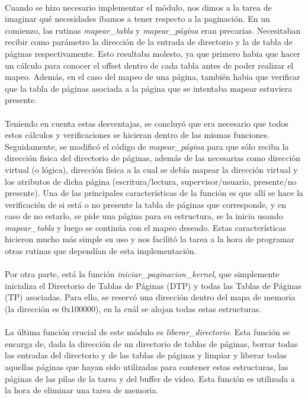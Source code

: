 \documentclass[11pt, a4paper]{article}
\begin{document}
\paragraph{}
Cuando se hizo necesario implementar el módulo, nos dimos a la tarea de imaginar qué necesidades íbamos a tener respecto a la paginación. En un comienzo, las rutinas \textit{mapear\_tabla} y \textit{mapear\_página} eran precarias. Necesitaban recibir como parámetro la dirección de la entrada de directorio y la de tabla de páginas respectivamente. Esto resultaba molesto, ya que primero habia que hacer un cálculo para conocer el offset dentro de cada tabla antes de poder realizar el mapeo. Además, en el caso del mapeo de una página, también habia que verificar que la tabla de páginas asociada a la página que se intentaba mapear estuviera presente.

\paragraph{}
Teniendo en cuenta estas desventajas, se concluyó que era necesario que todos estos cálculos y verificaciones se hicieran dentro de las mismas funciones. Seguidamente, se modificó el código de \textit{mapear\_página} para que sólo reciba la dirección fisica del directorio de páginas, además de las necesarias como dirección virtual (o lógica), dirección física a la cual se debía mapear la dirección virtual y los atributos de dicha página (escritura/lectura, supervisor/usuario, presente/no presente). Una de las principales características de la función es que allí se hace la verificación de si está o no presente la tabla de páginas que corresponde, y en caso de no estarlo, se pide una página para su estructura, se la inicia usando \textit{mapear\_tabla} y luego se continúa con el mapeo deseado. Estas características hicieron mucho más simple su uso y nos facilitó la tarea a la hora de programar otras rutinas que dependían de esta implementación.

\paragraph{}
Por otra parte, está la función \textit{iniciar\_paginacion\_kernel}, que simplemente inicializa el Directorio de Tablas de Páginas (DTP) y todas las Tablas de Páginas (TP) asociadas. Para ello, se reservó una dirección dentro del mapa de memoria (la dirección es 0x100000), en la cuál se alojan todas estas estructuras.

\paragraph{}
La última función crucial de este módulo es \textit{liberar\_directorio}. Esta función se encarga de, dada la dirección de un directorio de tablas de páginas, borrar todas las entradas del directorio y de las tablas de páginas y limpiar y liberar todas aquellas páginas que hayan sido utilizadas para contener estas estructuras, las páginas de las pilas de la tarea y del buffer de video. Esta función es utilizada a la hora de eliminar una tarea de memoria.
\end{document}
